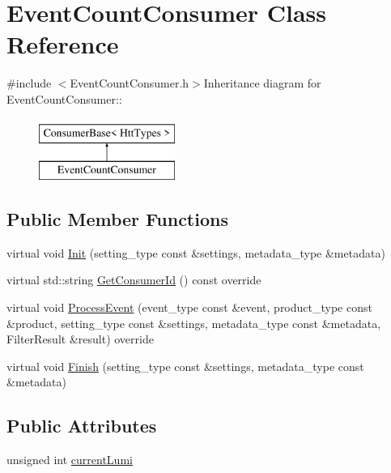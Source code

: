 \hypertarget{classEventCountConsumer}{
\section{EventCountConsumer Class Reference}
\label{classEventCountConsumer}
}


{\ttfamily \#include $<$EventCountConsumer.h$>$}Inheritance diagram for EventCountConsumer::\begin{figure}[H]
\begin{center}
\leavevmode
\includegraphics[height=2cm]{classEventCountConsumer}
\end{center}
\end{figure}
\subsection*{Public Member Functions}
\begin{DoxyCompactItemize}
\item 
virtual void \hyperlink{classEventCountConsumer_a2d04b40136bd826a4a004eb36c3354aa}{Init} (setting\_\-type const \&settings, metadata\_\-type \&metadata)
\item 
virtual std::string \hyperlink{classEventCountConsumer_a15515cd0d7c02f86003c8afbe6bc67fc}{GetConsumerId} () const override
\item 
virtual void \hyperlink{classEventCountConsumer_ad252ca05c06d57a5f333cdb2081349e1}{ProcessEvent} (event\_\-type const \&event, product\_\-type const \&product, setting\_\-type const \&settings, metadata\_\-type const \&metadata, FilterResult \&result) override
\item 
virtual void \hyperlink{classEventCountConsumer_a47a2bedb3b15c3b17de77d66696d6b34}{Finish} (setting\_\-type const \&settings, metadata\_\-type const \&metadata)
\end{DoxyCompactItemize}
\subsection*{Public Attributes}
\begin{DoxyCompactItemize}
\item 
unsigned int \hyperlink{classEventCountConsumer_a5bdcae7f74a5b2a8851c13c94a2c280e}{currentLumi}
\end{DoxyCompactItemize}
